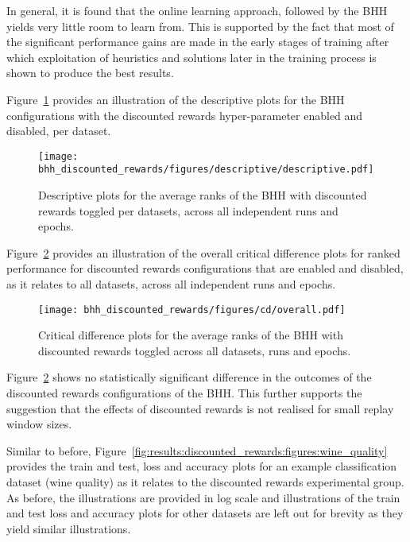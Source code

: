 In general, it is found that the online learning approach, followed by the \acs{BHH} yields very little room to learn from. This is supported by the fact that most of the significant performance gains are made in the early stages of training after which exploitation of heuristics and solutions later in the training process is shown to produce the best results.

Figure~\ref{fig:results:discounted_rewards:descriptive:descriptive} provides an illustration of the descriptive plots for the \acs{BHH} configurations with the discounted rewards hyper-parameter enabled and disabled, per dataset.

\begin{figure}[htb]
      \centering
      \texttt{[image: bhh\_discounted\_rewards/figures/descriptive/descriptive.pdf]}
      \caption{Descriptive plots for the average ranks of the \acs{BHH} with discounted rewards toggled per datasets, across all independent runs and epochs.}
      \label{fig:results:discounted_rewards:descriptive:descriptive}
\end{figure}

Figure~\ref{fig:results:discounted_rewards:descriptive:cd} provides an illustration of the overall critical difference plots for ranked performance for discounted rewards configurations that are enabled and disabled, as it relates to all datasets, across all independent runs and epochs.

\begin{figure}[htb]
      \centering
      \texttt{[image: bhh\_discounted\_rewards/figures/cd/overall.pdf]}
      \caption{Critical difference plots for the average ranks of the \acs{BHH} with discounted rewards toggled across all datasets, runs and epochs.}
      \label{fig:results:discounted_rewards:descriptive:cd}
\end{figure}

Figure~\ref{fig:results:discounted_rewards:descriptive:cd} shows no statistically significant difference in the outcomes of the discounted rewards configurations of the \acs{BHH}. This further supports the suggestion that the effects of discounted rewards is not realised for small replay window sizes.

Similar to before, Figure~\ref{fig:results:discounted_rewards:figures:wine_quality} provides the train and test, loss and accuracy plots for an example classification dataset (wine quality) as it relates to the discounted rewards experimental group. As before, the illustrations are provided in log scale and illustrations of the train and test loss and accuracy plots for other datasets are left out for brevity as they yield similar illustrations.

